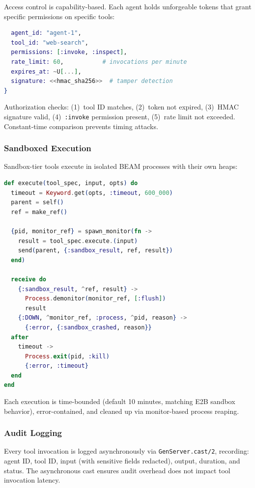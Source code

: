 \documentclass[12pt,a4paper]{article}
\theoremstyle{definition}
\begin{document}
Access control is capability-based. Each agent holds unforgeable tokens that
grant specific permissions on specific tools:

\begin{lstlisting}[language=elixir, caption={Capability token structure}]
%ToolInterface.Capability{
  agent_id: "agent-1",
  tool_id: "web-search",
  permissions: [:invoke, :inspect],
  rate_limit: 60,           # invocations per minute
  expires_at: ~U[...],
  signature: <<hmac_sha256>>  # tamper detection
}
\end{lstlisting}

Authorization checks: (1)~tool ID matches, (2)~token not expired,
(3)~HMAC signature valid, (4)~\texttt{:invoke} permission present,
(5)~rate limit not exceeded. Constant-time comparison prevents timing attacks.

\subsubsection{Sandboxed Execution}

Sandbox-tier tools execute in isolated BEAM processes with their own heaps:

\begin{lstlisting}[language=elixir, caption={Sandbox execution via spawn\_monitor}]
def execute(tool_spec, input, opts) do
  timeout = Keyword.get(opts, :timeout, 600_000)
  parent = self()
  ref = make_ref()

  {pid, monitor_ref} = spawn_monitor(fn ->
    result = tool_spec.execute.(input)
    send(parent, {:sandbox_result, ref, result})
  end)

  receive do
    {:sandbox_result, ^ref, result} ->
      Process.demonitor(monitor_ref, [:flush])
      result
    {:DOWN, ^monitor_ref, :process, ^pid, reason} ->
      {:error, {:sandbox_crashed, reason}}
  after
    timeout ->
      Process.exit(pid, :kill)
      {:error, :timeout}
  end
end
\end{lstlisting}

Each execution is time-bounded (default 10 minutes, matching E2B sandbox behavior),
error-contained, and cleaned up via monitor-based process reaping.

\subsubsection{Audit Logging}

Every tool invocation is logged asynchronously via \texttt{GenServer.cast/2},
recording: agent ID, tool ID, input (with sensitive fields redacted), output,
duration, and status. The asynchronous cast ensures audit overhead does not
impact tool invocation latency.
\end{document}
